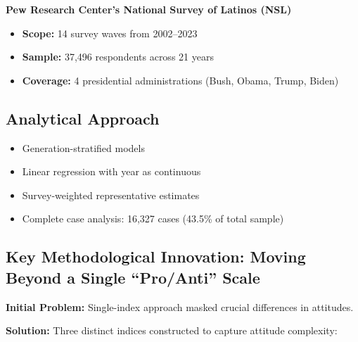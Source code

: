 \documentclass[11pt,letterpaper]{article}
\begin{document}
\textbf{Pew Research Center's National Survey of Latinos (NSL)}
\begin{itemize}
    \item \textbf{Scope:} 14 survey waves from 2002--2023
    \item \textbf{Sample:} 37,496 respondents across 21 years
    \item \textbf{Coverage:} 4 presidential administrations (Bush, Obama, Trump, Biden)
\end{itemize}

\subsection{Analytical Approach}
\begin{itemize}
    \item Generation-stratified models
    \item Linear regression with year as continuous
    \item Survey-weighted representative estimates
    \item Complete case analysis: 16,327 cases (43.5\% of total sample)
\end{itemize}

\subsection{Key Methodological Innovation: Moving Beyond a Single ``Pro/Anti'' Scale}

\textbf{Initial Problem:} Single-index approach masked crucial differences in attitudes.

\textbf{Solution:} Three distinct indices constructed to capture attitude complexity:
\end{document}
